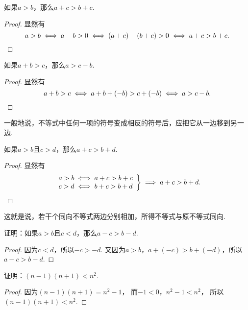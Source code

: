 \begin{theorem}\label{theorem:不等式.加法的单调性}
如果\(a>b\)，那么\(a+c>b+c\).
\begin{proof}
显然有\begin{equation*}
	a>b
	\iff a-b>0
	\iff (a+c)-(b+c)>0
	\iff a+c>b+c.
	\qedhere
\end{equation*}
\end{proof}
\end{theorem}

\begin{corollary}
如果\(a+b>c\)，那么\(a>c-b\).
\begin{proof}
显然有\begin{equation*}
	a+b>c
	\iff a+b+(-b)>c+(-b)
	\iff a>c-b.
	\qedhere
\end{equation*}
\end{proof}
\end{corollary}
一般地说，不等式中任何一项的符号变成相反的符号后，应把它从一边移到另一边.

\begin{corollary}
如果\(a>b\)且\(c>d\)，那么\(a+c>b+d\).
\begin{proof}
显然有\begin{equation*}
	\left. \begin{array}{c}
		a>b \iff a+c>b+c \\
		c>d \iff b+c>b+d
	\end{array} \right\}
	\implies a+c>b+d.
	\qedhere
\end{equation*}
\end{proof}
\end{corollary}
这就是说，若干个同向不等式两边分别相加，所得不等式与原不等式同向.

\begin{example}
证明：如果\(a > b\)且\(c < d\)，那么\(a - c > b - d\).
\begin{proof}
因为\(c < d\)，所以\(-c > -d\).
又因为\(a > b\)，\(a + (-c) > b + (-d)\)，所以\(a - c > b - d\).
\end{proof}
\end{example}

\begin{example}
证明：\((n-1)(n+1)<n^2\).
\begin{proof}
因为\((n-1)(n+1)=n^2-1\)，
而\(-1<0\)，\(n^2-1<n^2\)，
所以\((n-1)(n+1)<n^2\).
\end{proof}
\end{example}

